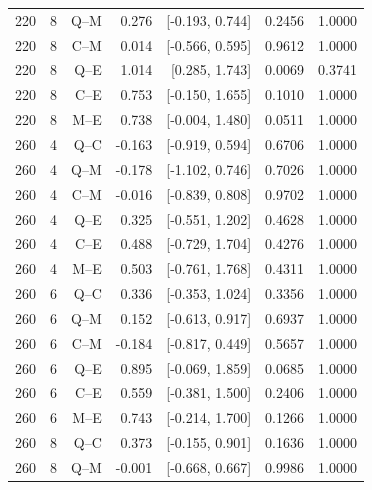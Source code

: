\begin{longtable}{@{}lrrrrrr@{}}
220 & 8 & Q--M & 0.276 & [-0.193, 0.744] & 0.2456 & 1.0000\\

220 & 8 & C--M & 0.014 & [-0.566, 0.595] & 0.9612 & 1.0000\\

220 & 8 & Q--E & 1.014 & [0.285, 1.743] & 0.0069 & 0.3741\\

220 & 8 & C--E & 0.753 & [-0.150, 1.655] & 0.1010 & 1.0000\\

220 & 8 & M--E & 0.738 & [-0.004, 1.480] & 0.0511 & 1.0000\\

260 & 4 & Q--C & -0.163 & [-0.919, 0.594] & 0.6706 & 1.0000\\

260 & 4 & Q--M & -0.178 & [-1.102, 0.746] & 0.7026 & 1.0000\\

260 & 4 & C--M & -0.016 & [-0.839, 0.808] & 0.9702 & 1.0000\\

260 & 4 & Q--E & 0.325 & [-0.551, 1.202] & 0.4628 & 1.0000\\

260 & 4 & C--E & 0.488 & [-0.729, 1.704] & 0.4276 & 1.0000\\

260 & 4 & M--E & 0.503 & [-0.761, 1.768] & 0.4311 & 1.0000\\

260 & 6 & Q--C & 0.336 & [-0.353, 1.024] & 0.3356 & 1.0000\\

260 & 6 & Q--M & 0.152 & [-0.613, 0.917] & 0.6937 & 1.0000\\

260 & 6 & C--M & -0.184 & [-0.817, 0.449] & 0.5657 & 1.0000\\

260 & 6 & Q--E & 0.895 & [-0.069, 1.859] & 0.0685 & 1.0000\\

260 & 6 & C--E & 0.559 & [-0.381, 1.500] & 0.2406 & 1.0000\\

260 & 6 & M--E & 0.743 & [-0.214, 1.700] & 0.1266 & 1.0000\\

260 & 8 & Q--C & 0.373 & [-0.155, 0.901] & 0.1636 & 1.0000\\

260 & 8 & Q--M & -0.001 & [-0.668, 0.667] & 0.9986 & 1.0000\\


\end{longtable}
